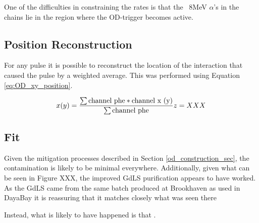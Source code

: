 \par
One of the difficulties in constraining the rates is that the ~8MeV $\alpha$'s in the chains lie in the region where the OD-trigger becomes active.


\subsection{Position Reconstruction}
\par
For any pulse it is possible to reconstruct the location of the interaction that caused the pulse by a weighted average.
This was performed using Equation \ref{eq:OD_xy_position}.

\begin{equation}
    x(y) = \frac{\sum{\text{channel phe} * \text{channel x (y)}}}{\sum{\text{channel phe}}} \\
       z = XXX 
    \label{eq:OD_xy_position}
\end{equation}


\subsection{Fit}
\par
Given the mitigation processes described in Section \ref{od_construction_sec}, the contamination is likely to be minimal everywhere. 
Additionally, given what can be seen in Figure XXX, the improved GdLS purification appears to have worked.
As the GdLS came from the same batch produced at Brookhaven as used in DayaBay it is reassuring that it matches closely what was seen there

\par
Instead, what is likely to have happened is that \cite{KamLAND_LS_contaminants_ref}.


